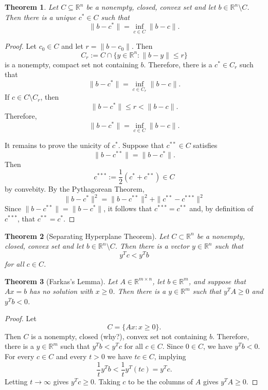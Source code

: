 \documentclass[12pt]{amsart}
\newtheorem{theorem}{Theorem}[section]
\theoremstyle{definition}
\theoremstyle{remark}
\numberwithin{equation}{section}
\newcommand{\RR}{\mathbb{R}}
\begin{document}
\begin{theorem}
    Let $C\subseteq \RR^n$ be a nonempty, closed, convex set and let
    $b\in\RR^n\setminus C$.
    Then there is a unique $c^*\in C$ such that
    \[
        \|b - c^*\| = \inf_{c\in C}\|b - c\|.
    \]
\end{theorem}

\begin{proof}
    Let $c_0\in C$ and let $r=\|b - c_0\|$.
    Then
    \[
        C_r := C\cap \{y\in\RR^n : \|b - y\|\leq r\}
    \]
    is a nonempty, compact set not containing $b$.
    Therefore, there is a $c^*\in C_r$ such that
    \[
        \|b - c^*\| = \inf_{c\in C_r}\|b - c\|.
    \]
    If $c\in C\setminus C_r$, then
    \[
        \|b - c^*\|\leq r < \|b - c\|.
    \]
    Therefore,
    \[
        \|b - c^*\| = \inf_{c\in C}\|b - c\|.
    \]

    It remains to prove the unicity of $c^*$.
    Suppose that $c^{**}\in C$ satisfies
    \[
        \|b - c^{**}\| = \|b - c^*\|.
    \]
    Then
    \[
        c^{***} := \frac12(c^* + c^{**}) \in C
    \]
    by convebity.
    By the Pythagorean Theorem,
    \[
        \|b - c^*\|^2 = \|b - c^{**}\|^2 + \|c^{**} - c^{***}\|^2
    \]
    Since $\|b - c^{**}\| = \|b - c^*\|$, it follows that $c^{***} = c^{**}$ and,
    by definition of $c^{***}$, that $c^{**}=c^*$.
\end{proof}

\begin{theorem}[Separating Hyperplane Theorem]
    Let $C\subset\RR^n$ be a nonempty, closed, convex set and let
    $b\in \RR^n\setminus C$.
    Then there is a vector $y\in\RR^n$ such that
    \[
        y^Tc < y^Tb
    \]
    for all $c\in C$.
\end{theorem}

\begin{theorem}[Farkas's Lemma]
    Let $A\in\RR^{m\times n}$, let $b\in \RR^m$, and suppose that
    $Ax=b$ has no solution with $x\geq 0$.
    Then there is a $y\in\RR^m$ such that $y^TA\geq 0$ and $y^Tb < 0$.
\end{theorem}

\begin{proof}
    Let
    \[
    C = \{Ax : x\geq 0\}.
    \]
    Then $C$ is a nonempty, closed (why?), convex set not containing $b$.
    Therefore, there is a $y\in\RR^m$ such that $y^Tb < y^Tc$ for all
    $c\in C$. Since $0\in C$, we have $y^Tb < 0$.
    For every $c\in C$ and every $t>0$ we have $tc\in C$, implying
    \[
        \frac1ty^Tb < \frac1ty^T(tc) = y^Tc.
    \]
    Letting $t\to\infty$ gives $y^Tc\geq 0$.
    Taking $c$ to be the columns of $A$ gives $y^TA\geq 0$.
\end{proof}
\end{document}
